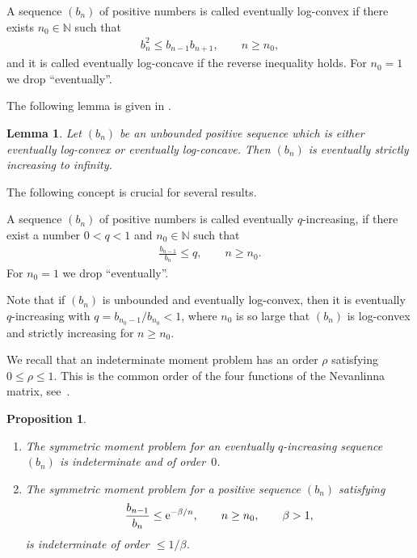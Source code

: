 \documentclass[pdftex]{sigma}
\newcommand{\N}{\mathbb{N}}
\numberwithin{equation}{section}
\newtheorem{prop}[thm]{Proposition}
\newtheorem{lem}[thm]{Lemma}
\begin{document}
\begin{defn}\label{thm:deflogcvcc} A sequence $(b_n)$ of positive numbers is called eventually log-convex if there exists $n_0\in\mathbb N$ such that
\begin{gather*}
b_n^2\le b_{n-1}b_{n+1},\qquad n\ge n_0,
\end{gather*}
and it is called eventually log-concave if the reverse inequality holds. For $n_0=1$ we drop ``eventually''.
\end{defn}

The following lemma is given in \cite[Lemma~4.1]{B:S2}.

\begin{lem}\label{thm:lemBS2} Let $(b_n)$ be an unbounded positive sequence which is either eventually log-convex or eventually log-concave. Then $(b_n)$ is eventually strictly increasing to infinity.
\end{lem}

The following concept is crucial for several results.

\begin{defn}\label{thm:defqinc} A sequence $(b_n)$ of positive numbers is called eventually $q$-increasing, if there exist a number $0<q<1$ and $n_0\in\N$ such that
\begin{gather}\label{eq:qinc}
\frac{b_{n-1}}{b_n}\le q,\qquad n\ge n_0.
\end{gather}
For $n_0=1$ we drop ``eventually''.
\end{defn}

Note that if $(b_n)$ is unbounded and eventually log-convex, then it is eventually $q$-increasing with $q=b_{n_0-1}/b_{n_0}<1$, where $n_0$ is so large that $(b_n)$ is log-convex and strictly increasing for $n \ge n_0$.

We recall that an indeterminate moment problem has an order $\rho$ satisfying $0 \le\rho\le 1$. This is the common order of the four functions of the Nevanlinna matrix, see~\cite{B:P}.

\begin{prop}\label{thm:qinc-indet}\quad
\begin{enumerate}\itemsep=0pt
\item[$(i)$] The symmetric moment problem for an eventually $q$-increasing sequence $(b_n)$ is indeterminate and of order~$0$.

\item[$(ii)$] The symmetric moment problem for a positive sequence $(b_n)$ satisfying
\begin{gather}\label{eq:betan}
\frac{b_{n-1}}{b_n}\le {\rm e}^{-\beta/n},\qquad n\ge n_0, \qquad \beta>1,
\end{gather}
is indeterminate of order $\le 1/\beta$.
\end{enumerate}
\end{prop}
\end{document}
